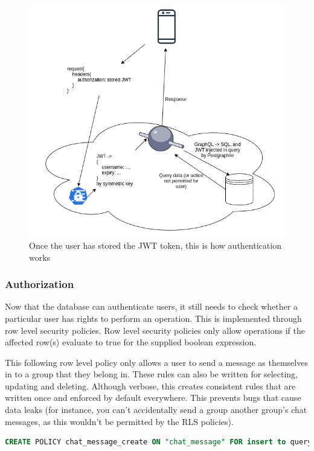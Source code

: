 \documentclass{l4proj}
\begin{document}
\begin{figure}[H]
    \centering
    \includegraphics[width=1.0\linewidth]{authentication.png}    
    \caption{
  Once the user has stored the JWT token, this is how authentication works
    }
\end{figure}


\subsubsection{Authorization}
Now that the database can authenticate users, it still needs to check whether a particular user has rights to perform an operation. This is implemented through row level security policies. Row level security policies only allow operations if the affected row(s) evaluate to true for the supplied boolean expression.

This following row level policy only allows a user to send a message as themselves in to a group that they belong in. These rules can also be written for selecting, updating and deleting. Although verbose, this creates consistent rules that are written once and enforced by default everywhere. This prevents bugs that cause data leaks (for instance, you can't accidentally send a group another group's chat messages, as this wouldn't be permitted by the RLS policies).

\begin{lstlisting}[language=SQL, caption={Row level security policy only allowing a user send messages as themselves to their team}, ]
CREATE POLICY chat_message_create ON "chat_message" FOR insert to query_sender with check (username = (select username from active_user()) and groupName = (select groupName from active_user()));
\end{lstlisting}
\end{document}
